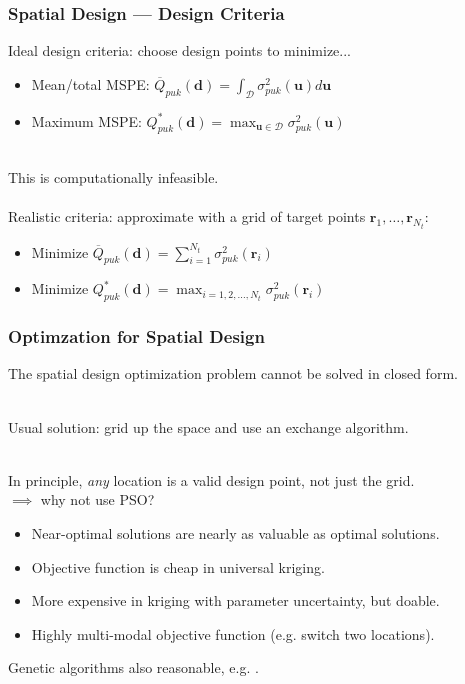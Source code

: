 \documentclass[xcolor=dvipsnames]{beamer}
\begin{document}
\begin{frame}
\frametitle{Spatial Design --- Design Criteria}
Ideal design criteria: choose design points to minimize...
\begin{itemize}
\item Mean/total MSPE: $\overline{Q}_{puk}(\bm{d}) = \int_{\mathcal{D}}\sigma_{puk}^2(\bm{u})d\bm{u}$
\item Maximum MSPE: $Q^*_{puk}(\bm{d}) = \max_{\bm{u}\in\mathcal{D}}\sigma_{puk}^2(\bm{u})$\\~\\
\end{itemize}

\pause

This is computationally infeasible. \pause \\~\\

Realistic criteria: approximate with a grid of target points $\bm{r}_1,\dots,\bm{r}_{N_t}$:
\begin{itemize}
\item Minimize $\overline{Q}_{puk}(\bm{d}) = \sum_{i=1}^{N_t}\sigma_{puk}^2(\bm{r}_i)$
\item Minimize $Q_{puk}^*(\bm{d}) = \max_{i=1,2,\dots,N_t}\sigma_{puk}^2(\bm{r}_i)$ \pause
\end{itemize}

\end{frame}

\begin{frame}
  \frametitle{Optimzation for Spatial Design}
  The spatial design optimization problem cannot be solved in closed form. \\~\\ \pause

  Usual solution: grid up the space and use an exchange algorithm. \citep{nychka1998design,wikle1999space,wikle2005dynamic} \\~\\ \pause

  In principle, \emph{any} location is a valid design point, not just the grid.\\
  $\implies$ why not use PSO? \pause \\
  \begin{itemize}
  \item Near-optimal solutions are nearly as valuable as optimal solutions.
  \item Objective function is cheap in universal kriging.
  \item More expensive in kriging with parameter uncertainty, but doable.
  \item Highly multi-modal objective function (e.g. switch two locations).\pause
  \end{itemize}

  Genetic algorithms also reasonable, e.g. \citet{hamada2001finding}.
\end{frame}
\end{document}
